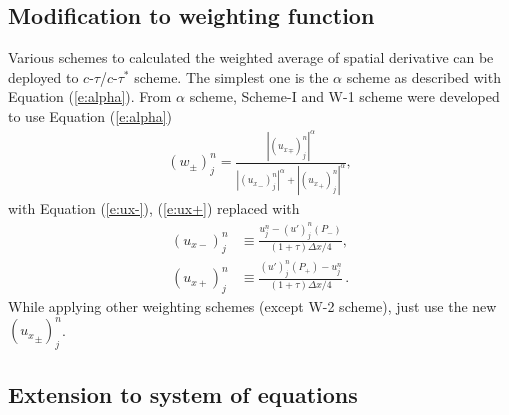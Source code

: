 \documentclass[letterpaper,12pt,dvips]{article}
\numberwithin{equation}{section}
\begin{document}
\subsection{Modification to weighting function}

Various schemes to calculated the weighted average of spatial derivative 
can be deployed to $c$-$\tau$/$c$-$\tau^*$ scheme.
The simplest one is the $\alpha$ scheme as described with 
Equation (\ref{e:alpha}).
From $\alpha$ scheme, Scheme-I\cite{b:chang02} and W-1 
scheme\cite{b:chang03} were developed to use Equation (\ref{e:alpha}) 
\begin{align*}
  (w_{\pm})_j^n = 
    \frac{|({u_x}_{\mp})_j^n|^{\alpha}}
         {|({u_x}_-)_j^n|^{\alpha}+|({u_x}_+)_j^n|^{\alpha}}, 
\end{align*}
with Equation (\ref{e:ux-}), (\ref{e:ux+}) replaced with 
\begin{align}
  (u_{x-})_j^n &\equiv 
    \frac{u_j^n - (u')_j^n(P_-)}{(1+\tau)\Delta x/4}, \label{e:uxp-} \\
  (u_{x+})_j^n &\equiv 
    \frac{(u')_j^n(P_+) - u_j^n}{(1+\tau)\Delta x/4}\,. \label{e:uxp+}
\end{align}
While applying other weighting schemes (except W-2 scheme), just use the 
new $({u_{x}}_{\pm})_j^n$.

\subsection{Extension to system of equations}
\end{document}
